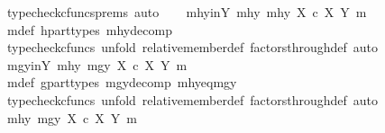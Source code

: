 \begin{isabellebody}
\ {\isacharparenleft}{\kern0pt}typecheck{\isacharunderscore}{\kern0pt}cfuncs{\isacharunderscore}{\kern0pt}prems{\isacharcomma}{\kern0pt}\ auto{\isacharparenright}{\kern0pt}\isanewline
\ \ \isamarkupfalse%
\ mhy{\isacharunderscore}{\kern0pt}in{\isacharunderscore}{\kern0pt}Y{\isacharcolon}{\kern0pt}\ {\isachardoublequoteopen}{\isasymlangle}mhy{}{\isacharcomma}{\kern0pt}\ mhy{}{\isasymrangle}\ {\isasymin}\isactrlbsub X\ {\isasymtimes}\isactrlsub c\ X\isactrlesub \ {\isacharparenleft}{\kern0pt}Y{\isacharcomma}{\kern0pt}\ m{\isacharparenright}{\kern0pt}{\isachardoublequoteclose}\isanewline
\ \ \ \ \isamarkupfalse%
\ m{\isacharunderscore}{\kern0pt}def\ h{\isacharunderscore}{\kern0pt}part{\isacharunderscore}{\kern0pt}types\ mhy{\isacharunderscore}{\kern0pt}decomp\isanewline
\ \ \ \ \isamarkupfalse%
\ {\isacharparenleft}{\kern0pt}typecheck{\isacharunderscore}{\kern0pt}cfuncs{\isacharcomma}{\kern0pt}\ unfold\ relative{\isacharunderscore}{\kern0pt}member{\isacharunderscore}{\kern0pt}def{}\ factors{\isacharunderscore}{\kern0pt}through{\isacharunderscore}{\kern0pt}def{}{\isacharcomma}{\kern0pt}\ auto{\isacharparenright}{\kern0pt}\isanewline
\ \ \isamarkupfalse%
\ mgy{\isacharunderscore}{\kern0pt}in{\isacharunderscore}{\kern0pt}Y{\isacharcolon}{\kern0pt}\ {\isachardoublequoteopen}{\isasymlangle}mhy{}{\isacharcomma}{\kern0pt}\ mgy{}{\isasymrangle}\ {\isasymin}\isactrlbsub X\ {\isasymtimes}\isactrlsub c\ X\isactrlesub \ {\isacharparenleft}{\kern0pt}Y{\isacharcomma}{\kern0pt}\ m{\isacharparenright}{\kern0pt}{\isachardoublequoteclose}\isanewline
\ \ \ \ \isamarkupfalse%
\ m{\isacharunderscore}{\kern0pt}def\ g{\isacharunderscore}{\kern0pt}part{\isacharunderscore}{\kern0pt}types\ mgy{\isacharunderscore}{\kern0pt}decomp\ mhy{}{\isacharunderscore}{\kern0pt}eq{\isacharunderscore}{\kern0pt}mgy{}\isanewline
\ \ \ \ \isamarkupfalse%
\ {\isacharparenleft}{\kern0pt}typecheck{\isacharunderscore}{\kern0pt}cfuncs{\isacharcomma}{\kern0pt}\ unfold\ relative{\isacharunderscore}{\kern0pt}member{\isacharunderscore}{\kern0pt}def{}\ factors{\isacharunderscore}{\kern0pt}through{\isacharunderscore}{\kern0pt}def{}{\isacharcomma}{\kern0pt}\ auto{\isacharparenright}{\kern0pt}\isanewline
\ \ \isamarkupfalse%
\ {\isachardoublequoteopen}{\isasymlangle}mhy{}{\isacharcomma}{\kern0pt}\ mgy{}{\isasymrangle}\ {\isasymin}\isactrlbsub X\ {\isasymtimes}\isactrlsub c\ X\isactrlesub \ {\isacharparenleft}{\kern0pt}Y{\isacharcomma}{\kern0pt}\ m{\isacharparenright}{\kern0pt}{\isachardoublequoteclose}\isanewline

\end{isabellebody}
